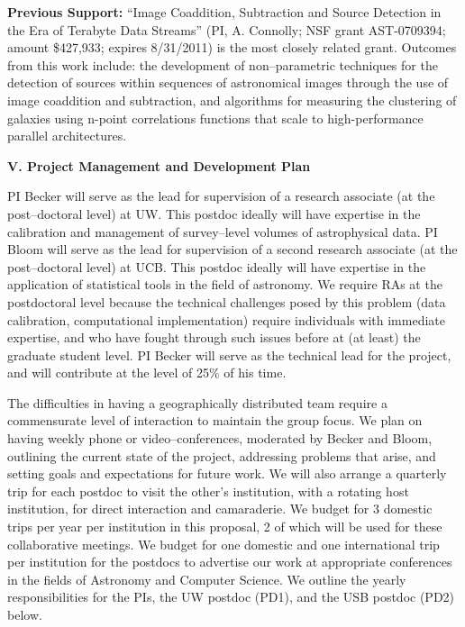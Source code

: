 {\bf Previous Support:} ``Image Coaddition, Subtraction and Source Detection in
the Era of Terabyte Data Streams'' (PI, A. Connolly; NSF grant AST-0709394;
amount \$427,933; expires 8/31/2011) is the most closely related grant. Outcomes
from this work include: the development of non--parametric techniques for the
detection of sources within sequences of astronomical images through the use of
image coaddition and subtraction, and algorithms for measuring the clustering of
galaxies using n-point correlations functions that scale to high-performance
parallel architectures.

\bigskip \centerline{\bf V. Project Management and Development Plan} \smallskip

PI Becker will serve as the lead for supervision of a research associate (at the
post--doctoral level) at UW.  This postdoc ideally will have expertise in the
calibration and management of survey--level volumes of astrophysical data.
PI Bloom will serve as the lead for supervision of a second research
associate (at the post--doctoral level) at UCB.  This postdoc ideally will have
expertise in the application of statistical tools in the field of astronomy.  We
require RAs at the postdoctoral level because the technical challenges posed by
this problem (data calibration, computational implementation) require
individuals with immediate expertise, and who have fought through such issues
before at (at least) the graduate student level. PI Becker will serve as the
technical lead for the project, and will contribute at the level of 25\% of his
time.

The difficulties in having a geographically distributed team require a
commensurate level of interaction to maintain the group focus.  We plan on
having weekly phone or video--conferences, moderated by Becker and Bloom,
outlining the current state of the project, addressing problems that arise, and
setting goals and expectations for future work.  We will also arrange a
quarterly trip for each postdoc to visit the other's institution, with a
rotating host institution, for direct interaction and camaraderie. We budget for
3 domestic trips per year per institution in this proposal, 2 of which will be
used for these collaborative meetings.  We budget for one domestic and one
international trip per institution for the postdocs to advertise our work at
appropriate conferences in the fields of Astronomy and Computer Science. We
outline the yearly responsibilities for the PIs, the UW postdoc (PD1), and the
USB postdoc (PD2) below.

